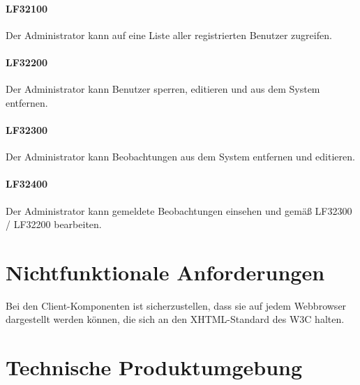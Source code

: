 \documentclass[a4paper,11pt]{scrartcl}
\begin{document}
			\paragraph{LF32100}
				Der Administrator kann auf eine Liste aller registrierten Benutzer zugreifen.
			\paragraph{LF32200}
				Der Administrator kann Benutzer sperren, editieren und aus dem System entfernen.
			\paragraph{LF32300}
				Der Administrator kann Beobachtungen aus dem System entfernen und editieren.
			\paragraph{LF32400}
				Der Administrator kann gemeldete Beobachtungen einsehen und gemäß LF32300 / LF32200 bearbeiten.





\section{Nichtfunktionale Anforderungen}
	Bei den Client-Komponenten ist sicherzustellen, dass sie auf jedem Webbrowser dargestellt werden können, die sich an den XHTML-Standard des W3C halten.
\section{Technische Produktumgebung}
\end{document}
